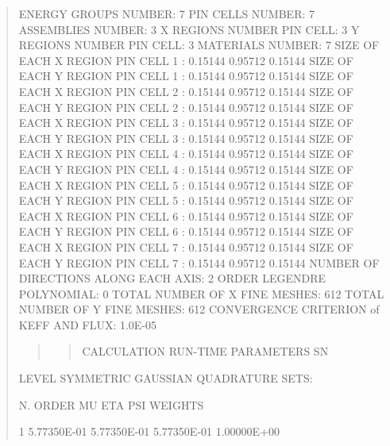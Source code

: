 \documentclass[letterpaper,10pt,english]{sphinxmanual}
\begin{document}
\begin{quote}
ENERGY GROUPS NUMBER:                               7
PIN CELLS NUMBER:                                   7
ASSEMBLIES NUMBER:                                  3
X REGIONS NUMBER PIN CELL:                          3
Y REGIONS NUMBER PIN CELL:                          3
MATERIALS NUMBER:                                   7
SIZE OF EACH X REGION PIN CELL 1  :                 0.15144   0.95712   0.15144
SIZE OF EACH Y REGION PIN CELL 1  :                 0.15144   0.95712   0.15144
SIZE OF EACH X REGION PIN CELL 2  :                 0.15144   0.95712   0.15144
SIZE OF EACH Y REGION PIN CELL 2  :                 0.15144   0.95712   0.15144
SIZE OF EACH X REGION PIN CELL 3  :                 0.15144   0.95712   0.15144
SIZE OF EACH Y REGION PIN CELL 3  :                 0.15144   0.95712   0.15144
SIZE OF EACH X REGION PIN CELL 4  :                 0.15144   0.95712   0.15144
SIZE OF EACH Y REGION PIN CELL 4  :                 0.15144   0.95712   0.15144
SIZE OF EACH X REGION PIN CELL 5  :                 0.15144   0.95712   0.15144
SIZE OF EACH Y REGION PIN CELL 5  :                 0.15144   0.95712   0.15144
SIZE OF EACH X REGION PIN CELL 6  :                 0.15144   0.95712   0.15144
SIZE OF EACH Y REGION PIN CELL 6  :                 0.15144   0.95712   0.15144
SIZE OF EACH X REGION PIN CELL 7  :                 0.15144   0.95712   0.15144
SIZE OF EACH Y REGION PIN CELL 7  :                 0.15144   0.95712   0.15144
NUMBER OF DIRECTIONS ALONG EACH AXIS:               2
ORDER LEGENDRE POLYNOMIAL:                          0
TOTAL NUMBER OF X FINE MESHES:                    612
TOTAL NUMBER OF Y FINE MESHES:                    612
CONVERGENCE CRITERION of KEFF AND FLUX:       1.0E-05
\begin{quote}
\begin{quote}

CALCULATION  RUN-TIME  PARAMETERS  SN
\end{quote}
\end{quote}

LEVEL  SYMMETRIC  GAUSSIAN  QUADRATURE  SETS:

\begin{DUlineblock}{0em}
\item[] N. ORDER           MU              ETA             PSI           WEIGHTS       \textbar{}
\end{DUlineblock}

\begin{DUlineblock}{0em}
\item[] 1          5.77350E-01     5.77350E-01     5.77350E-01     1.00000E+00    \textbar{}
\end{DUlineblock}


\end{quote}
\end{document}
